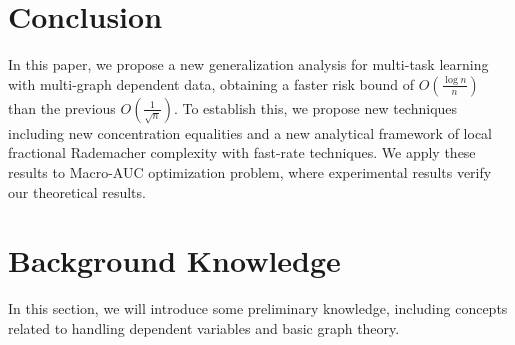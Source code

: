 \documentclass{article}
\begin{document}
\section{Conclusion}



In this paper, we propose a new generalization analysis for multi-task learning with multi-graph dependent data, obtaining a faster risk bound of $O(\frac{\log n}{n})$ than the previous $O(\frac{1}{\sqrt{n}})$. To establish this, we propose new techniques including new concentration equalities and a new analytical framework of local fractional Rademacher complexity with fast-rate techniques. We apply these results to Macro-AUC optimization problem, where experimental results verify our theoretical results. 


% 

% 

% 

% 
%

\newpage
\appendix 



\renewcommand{\contentsname}{Contents of Appendix}
\tableofcontents
{} 
\clearpage

\section{Background Knowledge} \label{section: F}
In this section, we will introduce some preliminary knowledge, including concepts related to handling dependent variables and basic graph theory.
\end{document}

